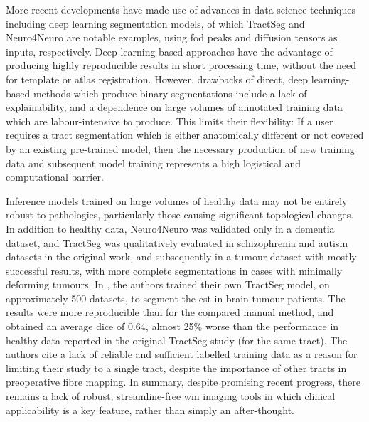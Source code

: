 More recent developments have made use of advances in data science techniques including deep learning segmentation models, of which TractSeg\autocite{Wasserthal2018} and Neuro4Neuro\autocite{Li2020} are notable examples, using \gls{fod} peaks and diffusion tensors as inputs, respectively.
Deep learning-based approaches have the advantage of producing highly reproducible results in short processing time, without the need for template or atlas registration.
However, drawbacks of direct, deep learning-based methods which produce binary segmentations include a lack of explainability, and a dependence on large volumes of annotated training data which are labour-intensive to produce.
This limits their flexibility:
If a user requires a tract segmentation which is either anatomically different or not covered by an existing pre-trained model, then the necessary production of new training data and subsequent model training represents a high logistical and computational barrier.

Inference models trained on large volumes of healthy data may not be entirely robust to pathologies, particularly those causing significant topological changes.
In addition to healthy data, Neuro4Neuro\autocite{Li2020} was validated only in a dementia dataset, and TractSeg\autocite{Wasserthal2018} was qualitatively evaluated in schizophrenia and autism datasets in the original work, and subsequently in a tumour dataset with mostly successful results, with more complete segmentations in cases with minimally deforming tumours\autocite{Richards2021}.
In \textcite{Moshe2022}, the authors trained their own TractSeg model, on approximately 500 datasets, to segment the \gls{cst} in brain tumour patients.
The results were more reproducible than for the compared manual method, and obtained an average \gls{dice} of 0.64, almost 25\% worse than the performance in healthy data reported in the original TractSeg study (for the same tract).
The authors cite a lack of reliable and sufficient labelled training data as a reason for limiting their study to a single tract, despite the importance of other tracts in preoperative fibre mapping.
In summary, despite promising recent progress, there remains a lack of robust, streamline-free \gls{wm} imaging tools in which clinical applicability is a key feature, rather than simply an after-thought.
